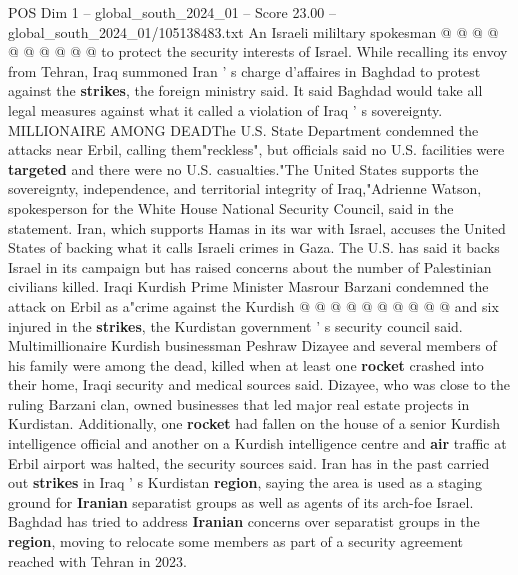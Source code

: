 \begin{textsample}{POS Dim 1 – global\_south\_2024\_01 – Score 23.00 – global\_south\_2024\_01/105138483.txt}
An Israeli mililtary spokesman @ @ @ @ @ @ @ @ @ @ to protect the security interests of Israel.
While recalling its envoy from Tehran, Iraq summoned Iran ' s charge d'affaires in Baghdad to protest against the \textbf{strikes}, the foreign ministry said.
It said Baghdad would take all legal measures against what it called a violation of Iraq ' s sovereignty.
MILLIONAIRE AMONG DEADThe U.S.
State Department condemned the attacks near Erbil, calling them"reckless", but officials said no U.S. facilities were \textbf{targeted} and there were no U.S. casualties."The United States supports the sovereignty, independence, and territorial integrity of Iraq,"Adrienne Watson, spokesperson for the White House National Security Council, said in the statement.
Iran, which supports Hamas in its war with Israel, accuses the United States of backing what it calls Israeli crimes in Gaza.
The U.S. has said it backs Israel in its campaign but has raised concerns about the number of Palestinian civilians killed.
Iraqi Kurdish Prime Minister Masrour Barzani condemned the attack on Erbil as a"crime against the Kurdish @ @ @ @ @ @ @ @ @ @ and six injured in the \textbf{strikes}, the Kurdistan government ' s security council said.
Multimillionaire Kurdish businessman Peshraw Dizayee and several members of his family were among the dead, killed when at least one \textbf{rocket} crashed into their home, Iraqi security and medical sources said.
Dizayee, who was close to the ruling Barzani clan, owned businesses that led major real estate projects in Kurdistan.
Additionally, one \textbf{rocket} had fallen on the house of a senior Kurdish intelligence official and another on a Kurdish intelligence centre and \textbf{air} traffic at Erbil airport was halted, the security sources said.
Iran has in the past carried out \textbf{strikes} in Iraq ' s Kurdistan \textbf{region}, saying the area is used as a staging ground for \textbf{Iranian} separatist groups as well as agents of its arch-foe Israel.
Baghdad has tried to address \textbf{Iranian} concerns over separatist groups in the \textbf{region}, moving to relocate some members as part of a security agreement reached with Tehran in 2023.

\end{textsample}

